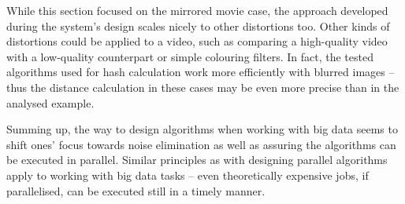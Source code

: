 While this section focused on the mirrored movie case, the approach developed during the system's design scales nicely to other distortions too. Other kinds of distortions could be applied to a video, such as comparing a high-quality video with a low-quality counterpart or simple colouring filters. In fact, the tested algorithms used for hash calculation work more efficiently with blurred images -- thus the distance calculation in these cases may be even more precise than in the analysed example.

Summing up, the way to design algorithms when working with big data seems to shift ones' focus towards noise elimination as well as assuring the algorithms can be executed in parallel. Similar principles as with designing parallel algorithms apply to working with big data tasks -- even theoretically expensive jobs, if parallelised, can be executed still in a timely manner.















